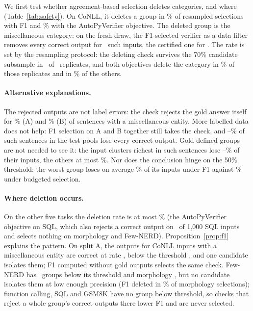 \documentclass[11pt]{article}
\begin{document}
We first test whether agreement-based selection deletes categories, and
where (Table~\ref{tab:safety}). On CoNLL, it deletes a group in \delRateFoneIE\% of resampled selections with F1 and \delRateApvIE\% with the
AutoPyVerifier objective. The deleted group is the miscellaneous category:
on the fresh draw, the F1-selected verifier as a data filter removes every
correct output for \frSubFoneIEHasElseType\ such inputs, the certified one
for \frSubCertIEHasElseType. The rate is set by the resampling protocol:
the deleting check survives the 70\% candidate subsample in \rdAvailIE\ of
\rdNIE\ replicates, and both objectives delete the category in
\rdDelAvailFoneIE\% of those replicates and in \rdDelNotFoneIE\% of the
others.

\paragraph{Alternative explanations.} The rejected outputs are not label
errors: the check rejects the gold answer itself for \advGoldRejA\% (A)
and \advGoldRejB\% (B) of sentences with a miscellaneous entity. More
labelled data does not help: F1 selection on A and B together still takes
the check, and \advABmin--\advABmax\% of such sentences in the test pools
lose every correct output. Gold-defined groups are not needed to see it:
the input clusters richest in such sentences lose
\advClRichMin--\advClRichMax\% of their inputs, the others at most
\advClPoorMax\%. Nor does the conclusion hinge on the 50\% threshold: the
worst group loses on average \worstMeanFoneIE\% of its inputs under F1
against \worstMeanBudgetIE\% under budgeted selection.

\paragraph{Where deletion occurs.} On the other five tasks the deletion
rate is at most \delRateApvSQL\% (the AutoPyVerifier objective on SQL,
which also rejects a correct output on \gammaKApvSQL\ of 1{,}000 SQL inputs
and selects nothing on morphology and Few-NERD). Proposition~\ref{prop:f1}
explains the pattern. On split A, the outputs for CoNLL inputs with a
miscellaneous entity are correct at rate \precIEElse, below the threshold \thrIE, and one
candidate isolates them; F1 computed without gold outputs selects the same
check. Few-NERD has \nDeletableFewnerd\ groups below its
threshold and morphology \nDeletableMorph, but no candidate isolates them
at low enough precision (F1 deleted in \delRateFoneMaxOther\% of morphology
selections); function calling, SQL and GSM8K have no group
below threshold, so checks that reject a whole group's correct outputs
there lower F1 and are never
selected.
\end{document}
